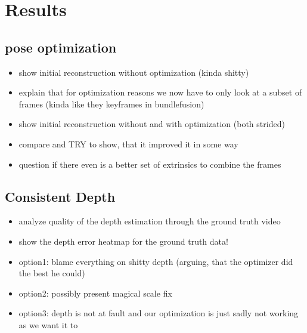 \chapter{Results}
    \section{pose optimization}
        \begin{itemize}
            \item show initial reconstruction without optimization (kinda shitty)
            \item explain that for optimization reasons we now have to only look at a subset of frames (kinda like they keyframes in bundlefusion)
            \item show initial reconstruction without and with optimization (both strided)
            \item compare and TRY to show, that it improved it in some way
            \item question if there even is a better set of extrinsics to combine the frames
        \end{itemize}
    \section{Consistent Depth}
        \begin{itemize}
            \item analyze quality of the depth estimation through the ground truth video
            \item show the depth error heatmap for the ground truth data!
            \item option1: blame everything on shitty depth (arguing, that the optimizer did the best he could)
            \item option2: possibly present magical scale fix
            \item option3: depth is not at fault and our optimization is just sadly not working as we want it to
        \end{itemize}